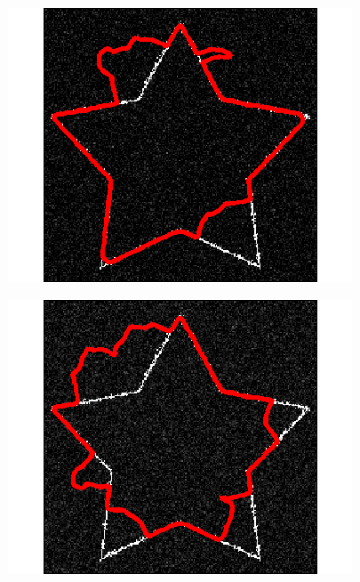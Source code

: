 \begin{appendices}
\begin{figure}[H]
\centering
\begin{subfigure}[c]{0.3\linewidth}
\centering
\includegraphics[width=\textwidth]{Chapters/Images/Noise/gvfg1}
\caption{}
\end{subfigure}
\begin{subfigure}[c]{0.3\linewidth}
\centering
\includegraphics[width=\textwidth]{Chapters/Images/Noise/gvfg5}
\caption{}
\end{subfigure}
\begin{subfigure}[c]{0.3\linewidth}
\centering

\end{subfigure}
\end{figure}
\end{appendices}
